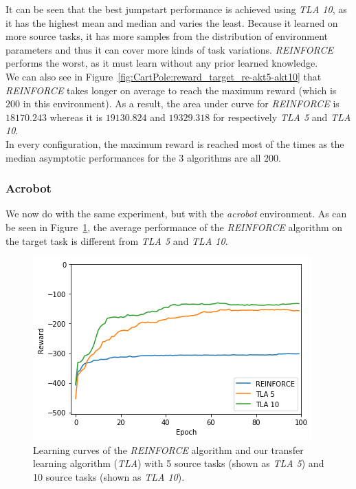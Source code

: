 It can be seen that the best jumpstart performance is achieved using \textit{TLA 10}, as it has the highest mean and median and varies the least. Because it learned on more source tasks, it has more samples from the distribution of environment parameters and thus it can cover more kinds of task variations. \textit{REINFORCE} performs the worst, as it must learn without any prior learned knowledge.\\

We can also see in Figure~\ref{fig:CartPole:reward_target_re-akt5-akt10} that \textit{REINFORCE} takes longer on average to reach the maximum reward (which is $200$ in this environment). As a result, the area under curve for \textit{REINFORCE} is $18170.243$ whereas it is $19130.824$ and $19329.318$ for respectively \textit{TLA 5} and \textit{TLA 10}.\\
In every configuration, the maximum reward is reached most of the times as the median asymptotic performances for the 3 algorithms are all $200$.

\subsubsection{Acrobot} %
\label{ssub:without_sparse_representation_transfer:acrobot}
We now do with the same experiment, but with the \textit{acrobot} environment.
As can be seen in Figure~\ref{fig:Acrobot:reward_target_re-akt5-akt10}, the average performance of the \textit{REINFORCE} algorithm on the target task is different from \textit{TLA 5} and \textit{TLA 10}.
\begin{figure}[htb]
    \centering
    \includegraphics[width=.8\linewidth]{images/results/Acrobot/no_sparse_transfer/reward_target_re-akt5-akt10.png}
    \caption[Learning curves for the \textit{acrobot} environment of \textit{REINFORCE} and \textit{TLA} for the \emph{Acrobot} environment]{Learning curves of the \textit{REINFORCE} algorithm and our transfer learning algorithm (\textit{TLA}) with 5 source tasks (shown as \textit{TLA 5}) and 10 source tasks (shown as \textit{TLA 10}).}
    \label{fig:Acrobot:reward_target_re-akt5-akt10}
\end{figure}

